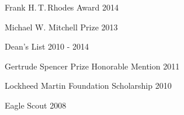 
Frank H.\,T.\,Rhodes Award \hfill 2014

Michael W. Mitchell Prize \hfill 2013

Dean's List \hfill 2010 - 2014

Gertrude Spencer Prize Honorable Mention \hfill 2011

Lockheed Martin Foundation Scholarship \hfill 2010

Eagle Scout \hfill 2008

